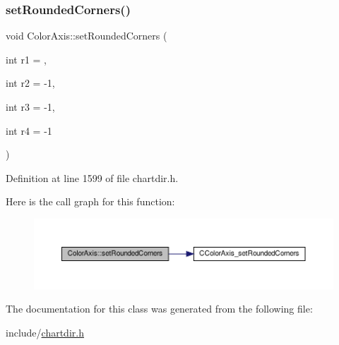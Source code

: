 \subsubsection{\texorpdfstring{set\+Rounded\+Corners()}{setRoundedCorners()}}
{\footnotesize\ttfamily void Color\+Axis\+::set\+Rounded\+Corners (\begin{DoxyParamCaption}\item[{int}]{r1 = {},  }\item[{int}]{r2 = {\ttfamily -\/1},  }\item[{int}]{r3 = {\ttfamily -\/1},  }\item[{int}]{r4 = {\ttfamily -\/1} }\end{DoxyParamCaption})\hspace{0.3cm}{\ttfamily [inline]}}



Definition at line 1599 of file chartdir.\+h.

Here is the call graph for this function\+:
\nopagebreak
\begin{figure}[H]
\begin{center}
\leavevmode
\includegraphics[width=350pt]{class_color_axis_a0bcbd3e8e36d3997f393261bf5432fcb_cgraph}
\end{center}
\end{figure}


The documentation for this class was generated from the following file\+:\begin{DoxyCompactItemize}
\item 
include/\hyperlink{chartdir_8h}{chartdir.\+h}\end{DoxyCompactItemize}
